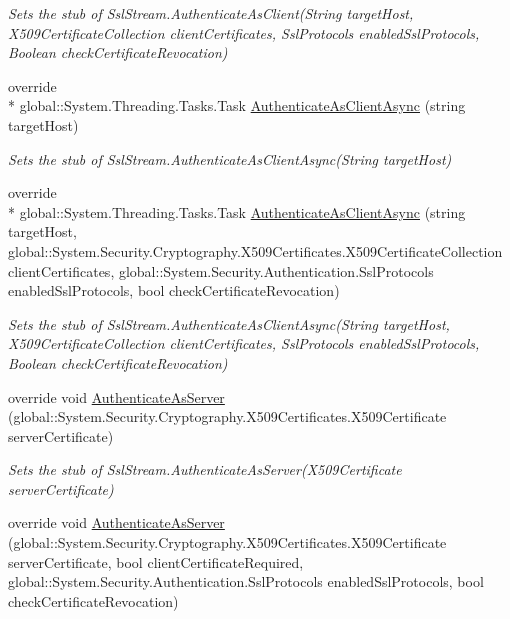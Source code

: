 \begin{DoxyCompactItemize}
\begin{DoxyCompactList}\small\item\em Sets the stub of Ssl\-Stream.\-Authenticate\-As\-Client(\-String target\-Host, X509\-Certificate\-Collection client\-Certificates, Ssl\-Protocols enabled\-Ssl\-Protocols, Boolean check\-Certificate\-Revocation)\end{DoxyCompactList}\item 
override \\*
global\-::\-System.\-Threading.\-Tasks.\-Task \hyperlink{class_system_1_1_net_1_1_security_1_1_fakes_1_1_stub_ssl_stream_a045b7401e95f48ee53a6f6c04339a4be}{Authenticate\-As\-Client\-Async} (string target\-Host)
\begin{DoxyCompactList}\small\item\em Sets the stub of Ssl\-Stream.\-Authenticate\-As\-Client\-Async(\-String target\-Host)\end{DoxyCompactList}\item 
override \\*
global\-::\-System.\-Threading.\-Tasks.\-Task \hyperlink{class_system_1_1_net_1_1_security_1_1_fakes_1_1_stub_ssl_stream_ae7e7b535b29864fe2b88234c759603ff}{Authenticate\-As\-Client\-Async} (string target\-Host, global\-::\-System.\-Security.\-Cryptography.\-X509\-Certificates.\-X509\-Certificate\-Collection client\-Certificates, global\-::\-System.\-Security.\-Authentication.\-Ssl\-Protocols enabled\-Ssl\-Protocols, bool check\-Certificate\-Revocation)
\begin{DoxyCompactList}\small\item\em Sets the stub of Ssl\-Stream.\-Authenticate\-As\-Client\-Async(\-String target\-Host, X509\-Certificate\-Collection client\-Certificates, Ssl\-Protocols enabled\-Ssl\-Protocols, Boolean check\-Certificate\-Revocation)\end{DoxyCompactList}\item 
override void \hyperlink{class_system_1_1_net_1_1_security_1_1_fakes_1_1_stub_ssl_stream_a181ff312f7aefc9c4c9e6d6a0e3bd89e}{Authenticate\-As\-Server} (global\-::\-System.\-Security.\-Cryptography.\-X509\-Certificates.\-X509\-Certificate server\-Certificate)
\begin{DoxyCompactList}\small\item\em Sets the stub of Ssl\-Stream.\-Authenticate\-As\-Server(\-X509\-Certificate server\-Certificate)\end{DoxyCompactList}\item 
override void \hyperlink{class_system_1_1_net_1_1_security_1_1_fakes_1_1_stub_ssl_stream_aab521edb148d0d3f73d4af3f8b5d5de3}{Authenticate\-As\-Server} (global\-::\-System.\-Security.\-Cryptography.\-X509\-Certificates.\-X509\-Certificate server\-Certificate, bool client\-Certificate\-Required, global\-::\-System.\-Security.\-Authentication.\-Ssl\-Protocols enabled\-Ssl\-Protocols, bool check\-Certificate\-Revocation)

\end{DoxyCompactItemize}

